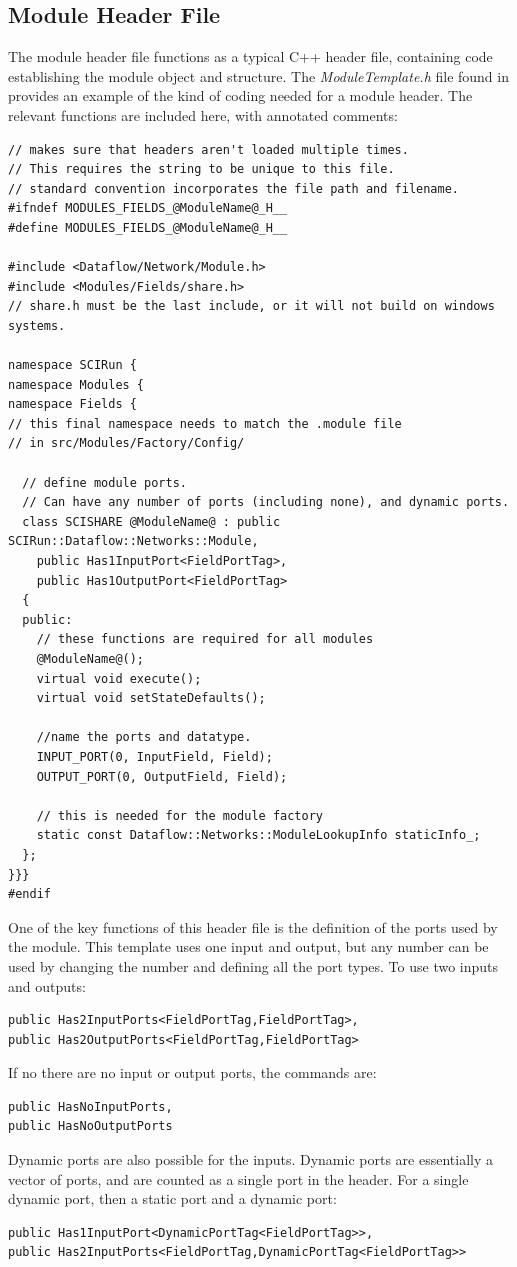 \documentclass[fleqn,11pt,openany]{book}
\begin{document}
\subsection{Module Header File}
\label{sec:header}

The module header file functions as a typical C++ header file, containing code establishing the module object and structure.  
The \emph{ModuleTemplate.h} file found in \emph{} provides an example of the kind of coding needed for a module header.  
The relevant functions are included here, with annotated comments:
\begin{verbatim}
// makes sure that headers aren't loaded multiple times. 
// This requires the string to be unique to this file.
// standard convention incorporates the file path and filename.
#ifndef MODULES_FIELDS_@ModuleName@_H__
#define MODULES_FIELDS_@ModuleName@_H__

#include <Dataflow/Network/Module.h>
#include <Modules/Fields/share.h>
// share.h must be the last include, or it will not build on windows systems.

namespace SCIRun {
namespace Modules {
namespace Fields {
// this final namespace needs to match the .module file
// in src/Modules/Factory/Config/
  
  // define module ports.  
  // Can have any number of ports (including none), and dynamic ports.
  class SCISHARE @ModuleName@ : public SCIRun::Dataflow::Networks::Module,
    public Has1InputPort<FieldPortTag>,
    public Has1OutputPort<FieldPortTag>
  {
  public:
    // these functions are required for all modules
    @ModuleName@();
    virtual void execute();
    virtual void setStateDefaults();
    
    //name the ports and datatype.
    INPUT_PORT(0, InputField, Field);
    OUTPUT_PORT(0, OutputField, Field);
  
    // this is needed for the module factory
    static const Dataflow::Networks::ModuleLookupInfo staticInfo_;
  };
}}}
#endif
\end{verbatim}
One of the key functions of this header file is the definition of the ports used by the module.  
This template uses one input and output, but any number can be used by changing the number and defining all the port types.
To use two inputs and outputs:
\begin{verbatim}
public Has2InputPorts<FieldPortTag,FieldPortTag>,
public Has2OutputPorts<FieldPortTag,FieldPortTag>
\end{verbatim}
If no there are no input or output ports, the commands are:
\begin{verbatim}
public HasNoInputPorts,
public HasNoOutputPorts
\end{verbatim}
Dynamic ports are also possible for the inputs.  
Dynamic ports are essentially a vector of ports, and are counted as a single port in the header.
For a single dynamic port, then a static port and a dynamic port:
\begin{verbatim}
public Has1InputPort<DynamicPortTag<FieldPortTag>>,
public Has2InputPorts<FieldPortTag,DynamicPortTag<FieldPortTag>>
\end{verbatim}
\end{document}

